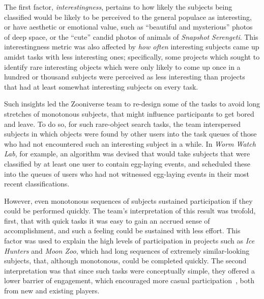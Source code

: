 \documentclass{sigchi}
\begin{document}
\begin{spacing}{0.97}

The first factor, \emph{interestingness}, pertains to how likely the subjects being classified would be likely to be perceived to the general populace as interesting, or have aesthetic or emotional value, such as ``beautiful and mysterious'' photos of deep space, or the ``cute'' candid photos of animals of \emph{Snapshot Serengeti}. This interestingness metric was also affected by \emph{how often} interesting subjects came up amidst tasks with less interesting ones; specifically, some projects which sought to identify rare interesting objects which were only likely to come up once in a hundred or thousand subjects were perceived as less interesting than projects that had at least somewhat interesting subjects on every task. 

Such insights led the Zooniverse team to re-design some of the tasks to avoid long stretches of monotonous subjects, that might influence participants to get bored and leave. To do so, for such rare-object search tasks, the team interspersed subjects in which objects were found by other users into the task queues of those who had not encountered such an interesting subject in a while. In \emph{Worm Watch Lab}, for example, an algorithm was devised that would take subjects that were classified by at least one user to contain egg-laying events, and scheduled these into the queues of users who had not witnessed egg-laying events in their most recent classifications. 

However, even monotonous sequences of subjects sustained participation if they could be performed quickly. The team's interpretation of this result was twofold, first, that with quick tasks it was easy to gain an accrued sense of accomplishment, and such a feeling could be sustained with less effort. This factor was used to explain the high levels of participation in projects such as \emph{Ice Hunters} and \emph{Moon Zoo}, which had long sequences of extremely similar-looking subjects, that, although monotonous, could be completed quickly. The second interpretation was that since such tasks were conceptually simple, they offered a lower barrier of engagement, which encouraged more casual participation~\cite{Kuittinen:2007:CGD:1328202.1328221}, both from new and existing players.


\end{spacing}
\end{document}
